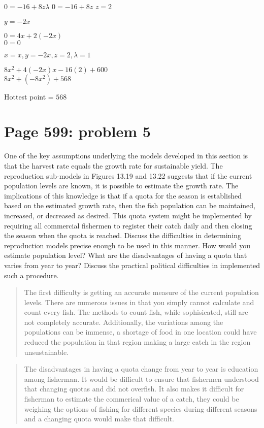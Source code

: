 \documentclass[]{article}
\begin{document}
\(0 = -16 + 8z \lambda\) \(0 = -16 + 8z\) \(z = 2\)

\(y = -2x\)

\(0 = 4x + 2(-2x)\)\\
\(0 = 0\)

\(x = x, y = -2x, z = 2, \lambda = 1\)

\(8x^2 + 4(-2x)x - 16(2) + 600\)\\
\(8x^2 + (-8x^2) + 568\)

Hottest point = \(568\)

\section{Page 599: problem 5}\label{page-599-problem-5}

One of the key assumptions underlying the models developed in this
section is that the harvest rate equals the growth rate for sustainable
yield. The reproduction sub-models in Figures 13.19 and 13.22 suggests
that if the current population levels are known, it is possible to
estimate the growth rate. The implications of this knowledge is that if
a quota for the season is established based on the estimated growth
rate, then the fish population can be maintained, increased, or
decreased as desired. This quota system might be implemented by
requiring all commercial fishermen to register their catch daily and
then closing the season when the quota is reached. Discuss the
difficulties in determining reproduction models precise enough to be
used in this manner. How would you estimate population level? What are
the disadvantages of having a quota that varies from year to year?
Discuss the practical political difficulties in implemented such a
procedure.

\begin{quote}
The first difficulty is getting an accurate measure of the current
population levels. There are numerous issues in that you simply cannot
calculate and count every fish. The methods to count fish, while
sophisicated, still are not completely accurate. Additionally, the
variations among the populations can be immense, a shortage of food in
one location could have reduced the population in that region making a
large catch in the region unsustainable.
\end{quote}

\begin{quote}
The disadvantages in having a quota change from year to year is
education among fisherman. It would be difficult to ensure that
fishermen understood that changing quotas and did not overfish. It also
makes it difficult for fisherman to estimate the commerical value of a
catch, they could be weighing the options of fishing for different
species during different seasons and a changing quota would make that
difficult.
\end{quote}
\end{document}
